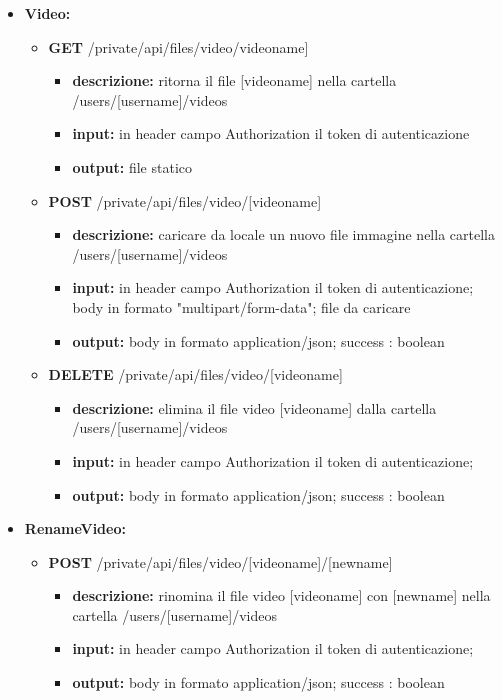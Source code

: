 {{\begin{itemize}
		\item \textbf{Video:}
			\begin{itemize}
			\item    \textbf{GET} /private/api/files/video/videoname]
				\begin{itemize} 
				\item \textbf{descrizione:} ritorna il file [videoname] nella cartella /users/[username]/videos					
				\item \textbf{input:} in header campo Authorization il token di autenticazione
				\item \textbf{output:} file statico
				\end{itemize}
			\item    \textbf{POST} /private/api/files/video/[videoname]
				\begin{itemize} 
				\item \textbf{descrizione:} caricare da locale un nuovo file immagine nella cartella /users/[username]/videos					
				\item \textbf{input:} in header campo Authorization il token di autenticazione; body in formato "multipart/form-data"; file da caricare
				\item \textbf{output:} body in formato application/json; success : boolean
				\end{itemize}
			\item   \textbf{DELETE} /private/api/files/video/[videoname]
				\begin{itemize} 
				\item \textbf{descrizione:} elimina il file video [videoname] dalla cartella /users/[username]/videos			
				\item \textbf{input:} in header campo Authorization il token di autenticazione;
				\item \textbf{output:} body in formato application/json; success : boolean
				\end{itemize}
			\end{itemize}
			
		\item \textbf{RenameVideo:}
			\begin{itemize}
			\item   \textbf{POST} /private/api/files/video/[videoname]/[newname] 
				\begin{itemize} 
				\item \textbf{descrizione:} rinomina il file video [videoname] con [newname] nella cartella /users/[username]/videos
				\item \textbf{input:} in header campo Authorization il token di autenticazione;
				\item \textbf{output:} body in formato application/json; success : boolean
				\end{itemize}
			\end{itemize}

			
	\end{itemize}
	}
}
	
	
	
	
	
	
	
	
	
	
	
	
	
	
	